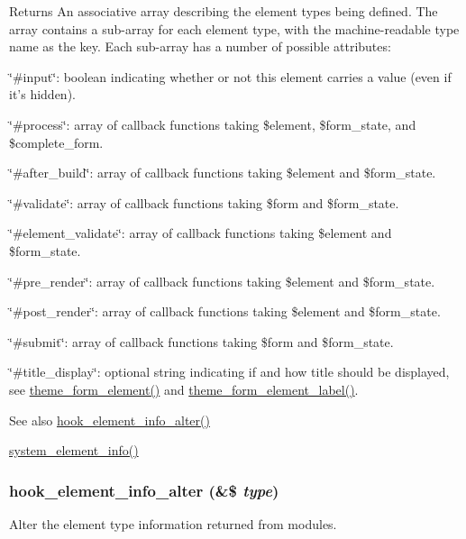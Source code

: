 \begin{DoxyReturn}{Returns}
An associative array describing the element types being defined. The array contains a sub-\/array for each element type, with the machine-\/readable type name as the key. Each sub-\/array has a number of possible attributes:
\begin{DoxyItemize}
\item \char`\"{}\#input\char`\"{}: boolean indicating whether or not this element carries a value (even if it's hidden).
\item \char`\"{}\#process\char`\"{}: array of callback functions taking \$element, \$form\_\-state, and \$complete\_\-form.
\item \char`\"{}\#after\_\-build\char`\"{}: array of callback functions taking \$element and \$form\_\-state.
\item \char`\"{}\#validate\char`\"{}: array of callback functions taking \$form and \$form\_\-state.
\item \char`\"{}\#element\_\-validate\char`\"{}: array of callback functions taking \$element and \$form\_\-state.
\item \char`\"{}\#pre\_\-render\char`\"{}: array of callback functions taking \$element and \$form\_\-state.
\item \char`\"{}\#post\_\-render\char`\"{}: array of callback functions taking \$element and \$form\_\-state.
\item \char`\"{}\#submit\char`\"{}: array of callback functions taking \$form and \$form\_\-state.
\item \char`\"{}\#title\_\-display\char`\"{}: optional string indicating if and how title should be displayed, see \hyperlink{group__themeable_gafa399c53da3c042edf3863f222d036aa}{theme\_\-form\_\-element()} and \hyperlink{group__themeable_gaf3ba527e41db52bfb82c3fc42207540d}{theme\_\-form\_\-element\_\-label()}.
\end{DoxyItemize}
\end{DoxyReturn}
\begin{DoxySeeAlso}{See also}
\hyperlink{group__hooks_gaf83b34170f31d93a7cfed56afa60007a}{hook\_\-element\_\-info\_\-alter()} 

\hyperlink{system_8module_a39faa9a5430a70bb37a3c8af72460a14}{system\_\-element\_\-info()} 
\end{DoxySeeAlso}
\hypertarget{group__hooks_gaf83b34170f31d93a7cfed56afa60007a}{
\subsubsection[{hook\_\-element\_\-info\_\-alter}]{\setlength{\rightskip}{0pt plus 5cm}hook\_\-element\_\-info\_\-alter (\&\$ {\em type})}}
\label{group__hooks_gaf83b34170f31d93a7cfed56afa60007a}
Alter the element type information returned from modules.

